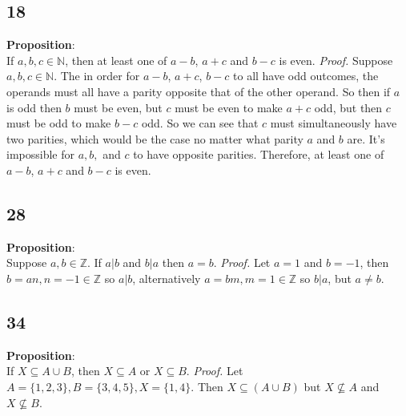 \documentclass[12pt]{article}
\begin{document}
\hfill\vline\hfill
\begin{minipage}[t]{0.45\textwidth}

\subsection*{18}
\textbf{Proposition}:  \\If $ a,b, c\in\mathbb{N} $, then at least one of $  a-b $, $ a+c $ and $ b-c $ is even.
\newline\textit{Proof.} Suppose $ a,b, c\in\mathbb{N} $. The in order for $  a-b $, $ a+c $,  $ b-c $ to all have odd outcomes, the operands must all have a parity opposite that of the other operand. So then if $ a $ is odd then $ b $ must be even, but $ c $ must be even to make $ a+c $ odd, but then $ c $ must be odd to make $ b-c $ odd. So we can see that $ c $ must simultaneously have two parities, which would be the case no matter what parity $ a $ and $ b $ are. It's impossible for $ a,b,$ and $ c $ to have opposite parities. Therefore, at least one of  $  a-b $, $ a+c $ and $ b-c $ is even.

\subsection*{28}
\textbf{Proposition}:  \\Suppose $ a,b\in\mathbb{Z} $. If $ a|b $ and $ b|a $ then $ a=b $.
\newline\textit{Proof.} Let $ a=1 $ and $ b=-1 $, then $ b=an, n=-1\in\mathbb{Z}$ so $ a|b $, alternatively $ a=bm, m=1\in\mathbb{Z}$ so $ b|a $, but $ a\not=b $.  


\end{minipage}
\pagebreak





\begin{minipage}[t]{0.40\textwidth}

\subsection*{34}
\textbf{Proposition}:  \\If $ X\subseteq A\cup B $, then $ X\subseteq A $ or $ X\subseteq B $.
\newline\textit{Proof.} Let $ A=\{1,2,3\}, B=\{3,4,5\}, X=\{1,4\} $. Then $ X\subseteq(A\cup B) $ but $ X\not\subseteq  A$ and $ X\not\subseteq  B$.



\end{minipage}
\end{document}
